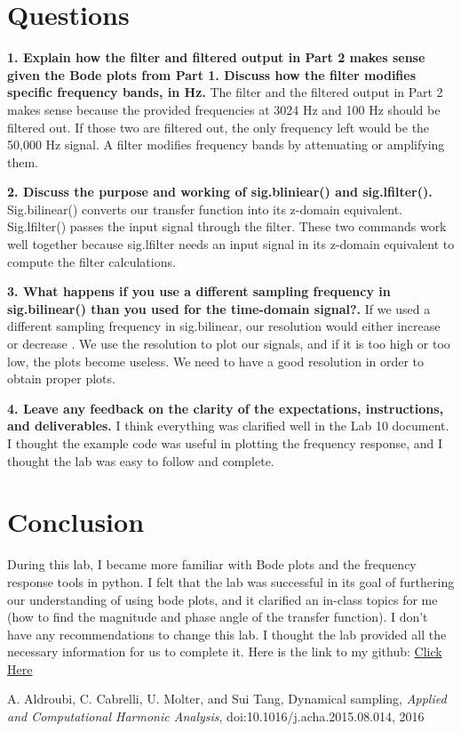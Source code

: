 \documentclass[12pt]{report}
\begin{document}
\section{Questions}

\textbf{1. Explain how the filter and filtered output in Part 2 makes sense given the Bode plots from Part 1. Discuss how the filter modifies specific frequency bands, in Hz.}
{The filter and the filtered output in Part 2 makes sense because the provided frequencies at 3024 Hz and 100 Hz should be filtered out. If those two are filtered out, the only frequency left would be the 50,000 Hz signal. A filter modifies frequency bands by attenuating or amplifying them. }

\textbf{2. Discuss the purpose and working of sig.bliniear() and sig.lfilter().}
{Sig.bilinear() converts our transfer function into its z-domain equivalent. Sig.lfilter() passes the input signal through the filter. These two commands work well together because sig.lfilter needs an input signal in its z-domain equivalent to compute the filter calculations.}

\textbf{3. What happens if you use a different sampling frequency in sig.bilinear() than you used for the time-domain signal?.}
{If we used a different sampling frequency in sig.bilinear, our resolution would either increase or decrease . We use the resolution to plot our signals, and if it is too high or too low, the plots become useless. We need to have a good resolution in order to obtain proper plots.}


\textbf{4. Leave any feedback on the clarity of the expectations, instructions, and deliverables.}
{I think everything was clarified well in the Lab 10 document. I thought the example code was useful in plotting the frequency response, and I thought the lab was easy to follow and complete.}

\newpage

\section{Conclusion}

During this lab, I became more familiar with Bode plots and the frequency response tools in python. I felt that the lab was successful in its goal of furthering our understanding of using bode plots, and it clarified an in-class topics for me (how to find the magnitude and phase angle of the transfer function). I don't have any recommendations to change this lab. I thought the lab provided all the necessary information for us to complete it. Here is the link to my github: \href{https://github.com/JMac1999}{Click Here}

\newpage


\begin{thebibliography}{111}

A. Aldroubi, C. Cabrelli, U. Molter, and Sui Tang,
Dynamical sampling, 
{\it  Applied and Computational Harmonic Analysis}, doi:10.1016/j.acha.2015.08.014, 2016


\end{thebibliography}
\end{document}
